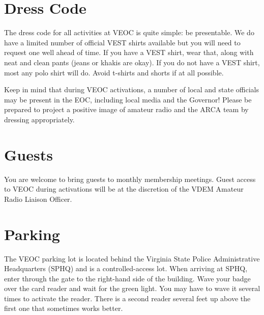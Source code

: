 \documentclass[pdflatex,letterpaper,twoside,12pt]{book}
\begin{document}

\section{Dress Code}

The dress code for all activities at VEOC is quite simple:  be presentable.  We do have a limited number of official VEST shirts available but you will need to request one well ahead of time.  If you have a VEST shirt, wear that, along with neat and clean pants (jeans or khakis are okay).  If you do not have a VEST shirt, most any polo shirt will do.  Avoid t-shirts and shorts if at all possible.

Keep in mind that during VEOC activations, a number of local and state officials may be present in the EOC, including local media and the Governor!  Please be prepared to project a positive image of amateur radio and the ARCA team by dressing appropriately.


\section{Guests}

You are welcome to bring guests to monthly membership meetings.  Guest access to VEOC during activations will be at the discretion of the VDEM Amateur Radio Liaison Officer.


\section{Parking}

The VEOC parking lot is located behind the Virginia State Police Administrative Headquarters (SPHQ) and is a controlled-access lot.  When arriving at SPHQ, enter through the gate to the right-hand side of the building.  Wave your badge over the card reader and wait for the green light.  You may have to wave it several times to activate the reader.  There is a second reader several feet up above the first one that sometimes works better.
\end{document}
